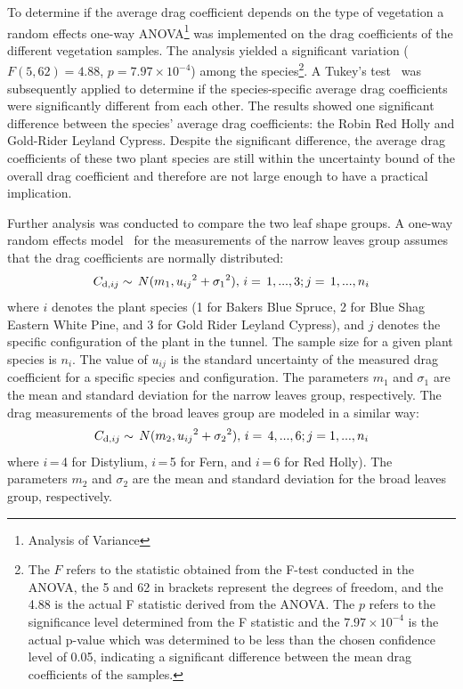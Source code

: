 \documentclass[12pt]{article}
\begin{document}
To determine if the average drag coefficient depends on the type of vegetation a random effects one-way ANOVA\footnote{Analysis of Variance} was implemented on the drag coefficients of the different vegetation samples. The analysis yielded a significant variation ($F(5,62)=4.88$, $p=7.97 \times 10^{-4}$) among the species\footnote{The $F$ refers to the statistic obtained from the F-test conducted in the ANOVA, the 5 and 62 in brackets represent the degrees of freedom, and the 4.88 is the actual F statistic derived from the ANOVA. The $p$ refers to the significance level determined from the F statistic and the $7.97 \times 10^{-4}$ is the actual p-value which was determined to be less than the chosen confidence level of 0.05, indicating a significant difference between the mean drag coefficients of the samples.}. A Tukey's test~\cite{Lane2010} was subsequently applied to determine if the species-specific average drag coefficients were significantly different from each other. The results showed one significant difference between the species' average drag coefficients: the Robin Red Holly and Gold-Rider Leyland Cypress. Despite the significant difference, the average drag coefficients of these two plant species are still within the uncertainty bound of the overall drag coefficient and therefore are not large enough to have a practical implication.

Further analysis was conducted to compare the two leaf shape groups. A one-way random effects model~\cite{Toman2009} for the measurements of the narrow leaves group assumes that the drag coefficients are normally distributed:
\begin{equation}
\label{eq:NarrowLeavesDragCoefficient}
C_{{\rm d},ij}\sim\,N(m_{1},{u_{ij}}^2+{\sigma_1}^2),\, i=\, 1,...,3; j=\, 1,...,n_{i}
\end{equation}
where $i$ denotes the plant species (1 for Bakers Blue Spruce, 2 for Blue Shag Eastern White Pine, and 3 for Gold Rider Leyland Cypress), and $j$ denotes the specific configuration of the plant in the tunnel. The sample size for a given plant species is $n_{i}$. The value of $u_{ij}$ is the standard uncertainty of the measured drag coefficient for a specific species and configuration. The parameters $m_{1}$ and $\sigma_1$ are the mean and standard deviation for the narrow leaves group, respectively. The drag measurements of the broad leaves group are modeled in a similar way:
\begin{equation}
\label{eq:BroadLeavesDragCoefficient}
C_{{\rm d},ij}\sim\,N(m_{2},{u_{ij}}^2+{\sigma_2}^2),\, i=\, 4,...,6; j = 1,...,n_{i}
\end{equation}
where $i$\,=\,4 for Distylium, $i$\,=\,5 for Fern, and $i$\,=\,6 for Red Holly). The parameters $m_2$ and $\sigma_2$ are the mean and standard deviation for the broad leaves group, respectively.
\end{document}
